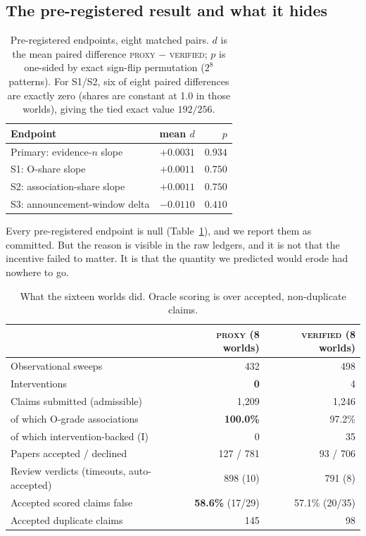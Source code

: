 \documentclass[11pt]{article}
\newcommand{\proxy}{\textsc{proxy}}
\newcommand{\verified}{\textsc{verified}}
\begin{document}
\subsection{The pre-registered result and what it hides}

\begin{table}[t]
\centering
\caption{Pre-registered endpoints, eight matched pairs. $d$ is the mean paired difference \proxy{} $-$ \verified{}; $p$ is one-sided by exact sign-flip permutation ($2^8$ patterns). For S1/S2, six of eight paired differences are exactly zero (shares are constant at 1.0 in those worlds), giving the tied exact value $192/256$.}
\label{tab:endpoints}
\begin{tabular}{lrr}
\toprule
Endpoint & mean $d$ & $p$ \\
\midrule
Primary: evidence-$n$ slope & $+0.0031$ & $0.934$ \\
S1: O-share slope & $+0.0011$ & $0.750$ \\
S2: association-share slope & $+0.0011$ & $0.750$ \\
S3: announcement-window delta & $-0.0110$ & $0.410$ \\
\bottomrule
\end{tabular}
\end{table}

Every pre-registered endpoint is null (Table~\ref{tab:endpoints}), and we report them as committed. But the reason is visible in the raw ledgers, and it is not that the incentive failed to matter. It is that the quantity we predicted would erode had nowhere to go.

\begin{table}[t]
\centering
\caption{What the sixteen worlds did. Oracle scoring is over accepted, non-duplicate claims.}
\label{tab:worlds}
\begin{tabular}{lrr}
\toprule
 & \proxy{} (8 worlds) & \verified{} (8 worlds) \\
\midrule
Observational sweeps & 432 & 498 \\
Interventions & \textbf{0} & 4 \\
Claims submitted (admissible) & 1{,}209 & 1{,}246 \\
\quad of which O-grade associations & \textbf{100.0\%} & 97.2\% \\
\quad of which intervention-backed (I) & 0 & 35 \\
Papers accepted / declined & 127 / 781 & 93 / 706 \\
Review verdicts (timeouts, auto-accepted) & 898 (10) & 791 (8) \\
Accepted scored claims false & \textbf{58.6\%} (17/29) & 57.1\% (20/35) \\
Accepted duplicate claims & 145 & 98 \\
\bottomrule
\end{tabular}
\end{table}
\end{document}

